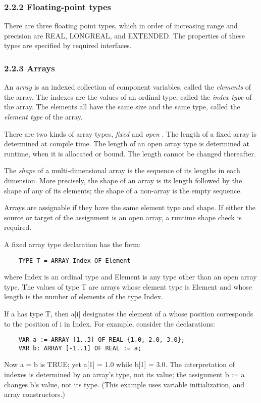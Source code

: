 \documentclass[10pt]{article}
\begin{document}
\subsubsection*{2.2.2 Floating-point types}

There are three floating point types, which in order of increasing range and
precision are REAL, LONGREAL, and EXTENDED. The properties of these types are
specified by required interfaces.

\subsubsection*{2.2.3 Arrays}

An \emph{array} is an indexed collection of component variables, called the
\emph{elements} of the array. The indexes are the values of an ordinal type,
called the \emph{index type} of the array. The elements all have the same size
and the same type, called the \emph{element type} of the array.

There are two kinds of array types, \emph{fixed} and \emph{open} . The length
of a fixed array is determined at compile time. The length of an open array
type is determined at runtime, when it is allocated or bound. The length
cannot be changed thereafter.

The \emph{shape} of a multi-dimensional array is the sequence of its lengths
in each dimension. More precisely, the shape of an array is its length
followed by the shape of any of its elements; the shape of a non-array is the
empty sequence.

Arrays are assignable if they have the same element type and shape. If either
the source or target of the assignment is an open array, a runtime shape check
is required.

A fixed array type declaration has the form:
\begin{verbatim}
    TYPE T = ARRAY Index OF Element
\end{verbatim}
where Index is an ordinal type and Element is any type other than an open
array type. The values of type T are arrays whose element type is Element and
whose length is the number of elements of the type Index.

If a has type T, then a[i] designates the element of a whose position
corresponds to the position of i in Index. For example, consider the
declarations:
\begin{verbatim}
    VAR a := ARRAY [1..3] OF REAL {1.0, 2.0, 3.0};
    VAR b: ARRAY [-1..1] OF REAL := a;
\end{verbatim}
Now a = b is TRUE; yet a[1] = 1.0 while b[1] = 3.0. The interpretation of
indexes is determined by an array's type, not its value; the assignment b := a
changes b's value, not its type. (This example uses variable initialization,
and array constructors.)
\end{document}
